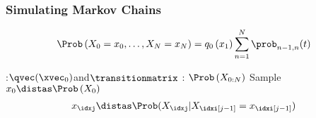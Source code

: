 \subsubsection{Simulating Markov Chains}\label{subsubsec:simulating_markov_chains}
\begin{corbox}\nospacing
  \begin{cor}\label{cor:realization_of_a_markov_chain}
    \begin{align*}
      \Prob\left(X_{0}=x_{0},\ldots,X_{N}=x_{N}\right)=q_{0}\left(x_{1}\right)\sum_{n=1}^{N}\prob_{n-1,n}(t)
    \end{align*}
  \end{cor}
\end{corbox}
\begin{algorithmbox}\nospacing
  \begin{algo}\leavevmode
\begin{algorithmic}[5]
  \State{}:\qquad$\qvec(\xvec_0)$\quad and\quad$\transitionmatrix$
  \State{}: $\Prob\left(X_{0:N}\right)$
  \State Sample $x_{0}\distas\Prob\left(X_{0}\right)$
    \begin{align*}
      x_{\idxj}\distas\Prob(X_{\idxj}|X_{\idxi[j-1]}=x_{\idxi[j-1]})
    \end{align*}
  \EndFor
\end{algorithmic}
\end{algo}
\end{algorithmbox}
